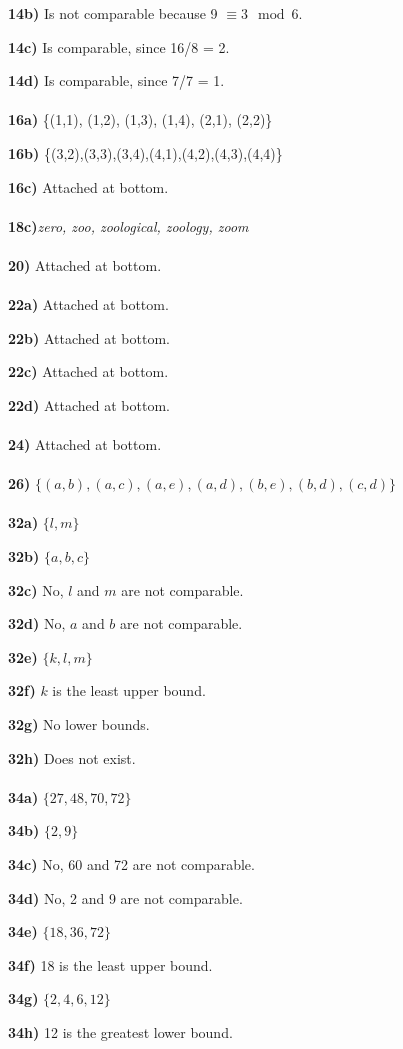\documentclass{article}
\begin{document}
\noindent\textbf{14b)} Is not comparable because 9 $\equiv 3 \mod{6}$.

\noindent\textbf{14c)} Is comparable, since 16/8 = 2.

\noindent\textbf{14d)} Is comparable, since 7/7 = 1.
\\\\\noindent\textbf{16a)} \{(1,1), (1,2), (1,3), (1,4), (2,1), (2,2)\}

\noindent\textbf{16b)} \{(3,2),(3,3),(3,4),(4,1),(4,2),(4,3),(4,4)\}

\noindent\textbf{16c)} Attached at bottom.
\\\\\noindent\textbf{18c)}\textit{zero, zoo, zoological, zoology, zoom}
\\\\\noindent\textbf{20)} Attached at bottom.
\\\\\noindent\textbf{22a)} Attached at bottom.

\noindent\textbf{22b)} Attached at bottom.

\noindent\textbf{22c)} Attached at bottom.

\noindent\textbf{22d)} Attached at bottom.
\\\\\noindent\textbf{24)} Attached at bottom.
\\\\\noindent\textbf{26)} $\{(a,b),(a,c),(a,e),(a,d),(b,e),(b,d),(c,d)\}$
\\\\\noindent\textbf{32a)} $\{l,m\}$

\noindent\textbf{32b)} $\{a,b,c\}$

\noindent\textbf{32c)} No, $l$ and $m$ are not comparable.

\noindent\textbf{32d)} No, $a$ and $b$ are not comparable.

\noindent\textbf{32e)} $\{k,l,m\}$

\noindent\textbf{32f)} $k$ is the least upper bound.

\noindent\textbf{32g)} No lower bounds.

\noindent\textbf{32h)} Does not exist.
\\\\\noindent\textbf{34a)} $\{27,48,70,72\}$

\noindent\textbf{34b)} $\{2,9\}$

\noindent\textbf{34c)} No, 60 and 72 are not comparable.

\noindent\textbf{34d)} No, 2 and 9 are not comparable.

\noindent\textbf{34e)} $\{18,36,72\}$

\noindent\textbf{34f)} 18 is the least upper bound.

\noindent\textbf{34g)} $\{2,4,6,12\}$

\noindent\textbf{34h)} 12 is the greatest lower bound.
\end{document}
